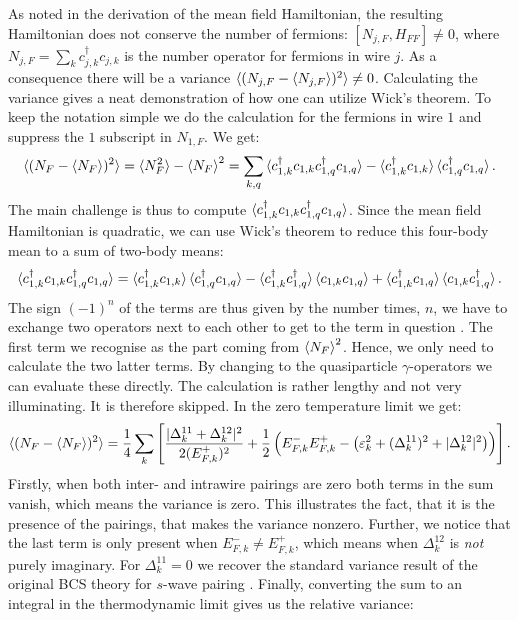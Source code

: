 As noted in the derivation of the mean field Hamiltonian, the resulting Hamiltonian does not conserve the number of fermions: $[N_{j,F}, H_{FF}] \neq 0 $, where $N_{j,F} = \sum_k c^\dagger_{j,k} c_{j,k}$ is the number operator for fermions in wire $j$. As a consequence there will be a variance $\braket{(N_{j,F}-\braket{N_{j,F}})^2} \neq 0$. Calculating the variance gives a neat demonstration of how one can utilize Wick's theorem. To keep the notation simple we do the calculation for the fermions in wire $1$ and suppress the $1$ subscript in $N_{1,F}$. We get:
\begin{equation}
\braket{(N_F - {\braket{N_F}})^2} = \braket{N_F^2} - \braket{N_F}^2 = \sum_{k,q} \braket{c^\dagger_{1,k}c_{1,k}c^\dagger_{1,q}c_{1,q}} - \braket{c^\dagger_{1,k}c_{1,k}}\braket{c^\dagger_{1,q}c_{1,q}}. \nonumber
\end{equation} 
The main challenge is thus to compute $\braket{c^\dagger_{1,k}c_{1,k}c^\dagger_{1,q}c_{1,q}}$. Since the mean field Hamiltonian is quadratic, we can use Wick's theorem to reduce this four-body mean to a sum of two-body means:
\begin{equation}
\braket{c^\dagger_{1,k}c_{1,k}c^\dagger_{1,q}c_{1,q}} = \braket{c^\dagger_{1,k}c_{1,k}}\braket{c^\dagger_{1,q}c_{1,q}} - \braket{c^\dagger_{1,k}c^\dagger_{1,q}}\braket{c_{1,k}c_{1,q}} + \braket{c^\dagger_{1,k}c_{1,q}}\braket{c_{1,k}c^\dagger_{1,q}}. \nonumber
\end{equation}
The sign $(-1)^{n}$ of the terms are thus given by the number times, $n$, we have to exchange two operators next to each other to get to the term in question \cite[pp. 198-202]{BruusFlensberg}. The first term we recognise as the part coming from $\braket{N_F}^2$. Hence, we only need to calculate the two latter terms. By changing to the quasiparticle $\gamma$-operators we can evaluate these directly. The calculation is rather lengthy and not very illuminating. It is therefore skipped. In the zero temperature limit we get:
\begin{equation}
\braket{(N_F - {\braket{N_F}})^2} = \frac{1}{4}\sum_k\left[ \frac{|\Delta^{11}_k + \Delta^{12}_k|^2}{2(E^{+}_{F,k})^2} + \frac{1}{2}\left(E^{-}_{F,k}E^{+}_{F,k} - \left(\varepsilon_k^2 + (\Delta^{11}_k)^2 + |\Delta^{12}_k|^2\right) \right) \right].
\end{equation}
Firstly, when both inter- and intrawire pairings are zero both terms in the sum vanish, which means the variance is zero. This illustrates the fact, that it is the presence of the pairings, that makes the variance nonzero. Further, we notice that the last term is only present when $E^{-}_{F,k} \neq E^{+}_{F,k}$, which means when $\Delta^{12}_k$ is \textit{not} purely imaginary. For $\Delta^{11}_k = 0$ we recover the standard variance result of the original BCS theory for $s$-wave pairing \cite[pp. 50-52]{Tinkham}. Finally, converting the sum to an integral in the thermodynamic limit gives us the relative variance:
